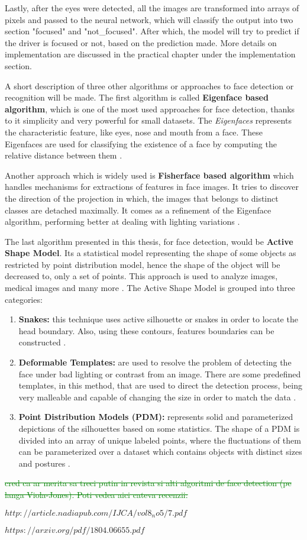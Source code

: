 Lastly, after the eyes were detected, all the images are transformed into arrays of pixels and passed to the neural network, which will classify the output into two section "focused" and "not\_focused". After which, the model will try to predict if the driver is focused or not, based on the prediction made. More details on implementation are discussed in the practical chapter under the implementation section.

A short description of three other algorithms or approaches to face detection or recognition will be made. The first algorithm is called \textbf{Eigenface based algorithm}, which is one of the most used approaches for face detection, thanks to it simplicity and very powerful for small datasets. The \textit{Eigenfaces} represents the characteristic feature, like eyes, nose and mouth from a face. These Eigenfaces are used for classifying the existence of a face by computing the relative distance between them \cite{Review}. \par

Another approach which is widely used is \textbf{Fisherface based algorithm} which handles mechanisms for extractions of features in face images. It tries to discover the direction of the projection in which, the images that belongs to distinct classes are detached maximally. It comes as a refinement of the Eigenface algorithm, performing better at dealing with lighting variations \cite{Review}.

The last algorithm presented in this thesis, for face detection, would be \textbf{Active Shape Model}. Its a statistical model representing the shape of some objects as restricted by point distribution model, hence the shape of the object will be decreased to, only a set of points. This approach is used to analyze images, medical images and many more \cite{Survey}. The Active Shape Model is grouped into three categories:

\begin{enumerate}
    \item \textbf{Snakes:} this technique uses active silhouette or snakes in order to locate the head boundary. Also, using these contours, features boundaries can be constructed \cite{Survey}. 
    \item \textbf{Deformable Templates:} are used to resolve the problem of detecting the face under bad lighting or contrast from an image. There are some predefined
    templates, in this method, that are used to direct the detection process, being very malleable and capable of changing the size in order to match the data \cite{Survey}.
    \item \textbf{Point Distribution Models (PDM):} represents solid and parameterized depictions of the silhouettes based on some statistics. The shape of a PDM is divided into an array of unique labeled points, where the fluctuations of them can be parameterized over a dataset which contains objects with distinct sizes and postures \cite{Survey}.
\end{enumerate}

\textcolor{green}{\sout{cred ca ar merita sa treci putin in revista si alti algoritmi de face detection (pe langa Viola-Jones). Poti vedea aici cateva recenzii:}}

$http://article.nadiapub.com/IJCA/vol8_no5/7.pdf$

$https://arxiv.org/pdf/1804.06655.pdf$